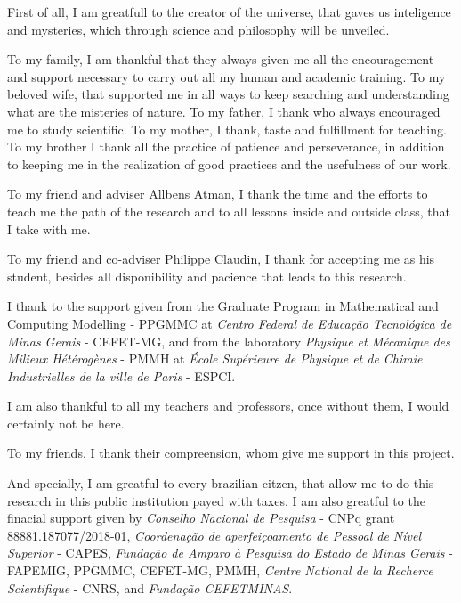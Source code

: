 
\begin{agradecimentos}[Acknowledgements]

First of all, I am greatfull to the creator of the universe, that gaves us inteligence and mysteries, which through science and philosophy will be unveiled.

To my family, I am thankful that they always given me all the encouragement and support necessary to carry out all my human and academic training. To my beloved wife, that supported me in all ways to keep searching and understanding what are the misteries of nature. To my father, I thank who always encouraged me to study scientific. To my mother, I thank, taste and fulfillment for teaching. To my brother I thank all the practice of patience and perseverance, in addition to keeping me in the realization of good practices and the usefulness of our work.

To my friend and adviser Allbens Atman, I thank the time and the efforts to teach me the path of the research and to all lessons inside and outside class, that I take with me.

To my friend and co-adviser Philippe Claudin, I thank for accepting me as his student, besides all disponibility and pacience that leads to this research.

I thank to the support given from the Graduate Program in Mathematical and Computing Modelling - PPGMMC at \textit{Centro Federal de Educação Tecnológica de Minas Gerais} - CEFET-MG, and from the laboratory \textit{Physique et Mécanique des Milieux Hétérogènes} - PMMH at \textit{École Supérieure de Physique et de Chimie Industrielles de la ville de Paris} - ESPCI.

I am also thankful to all my teachers and professors, once without them, I would certainly not be here.

To my friends, I thank their compreension, whom give me support in this project.

And specially, I am greatful to every brazilian citzen, that allow me to do this research in this public institution payed with taxes. I am also greatful to the finacial support given by \textit{Conselho Nacional de Pesquisa} - CNPq grant 88881.187077/2018-01, \textit{Coordenação de aperfeiçoamento de Pessoal de Nível Superior} - CAPES, \textit{Fundação de Amparo à Pesquisa do Estado de Minas Gerais} - FAPEMIG, PPGMMC, CEFET-MG, PMMH, \textit{Centre National de la Recherce Scientifique} - CNRS, and \textit{Fundação CEFETMINAS}.


\end{agradecimentos}
